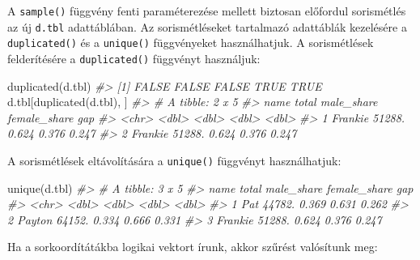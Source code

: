 \documentclass[
]{book}
\newenvironment{Shaded}{\begin{snugshade}}{\end{snugshade}}
\newcommand{\CommentTok}[1]{\textcolor[rgb]{0.56,0.35,0.01}{\textit{#1}}}
\newcommand{\FunctionTok}[1]{\textcolor[rgb]{0.00,0.00,0.00}{#1}}
\newcommand{\NormalTok}[1]{#1}
\begin{document}
A \texttt{sample()} függvény fenti paraméterezése mellett biztosan előfordul sorismétlés az új \texttt{d.tbl} adattáblában.
Az sorismétléseket tartalmazó adattáblák kezelésére a \texttt{duplicated()} és a \texttt{unique()} függvényeket használhatjuk. A sorismétlések felderítésére a \texttt{duplicated()} függvényt használjuk:

\begin{Shaded}
\begin{Highlighting}[]
\FunctionTok{duplicated}\NormalTok{(d.tbl)}
\CommentTok{\#\textgreater{} [1] FALSE FALSE FALSE  TRUE  TRUE}
\NormalTok{d.tbl[}\FunctionTok{duplicated}\NormalTok{(d.tbl), ]}
\CommentTok{\#\textgreater{} \# A tibble: 2 x 5}
\CommentTok{\#\textgreater{}   name     total male\_share female\_share   gap}
\CommentTok{\#\textgreater{}   \textless{}chr\textgreater{}    \textless{}dbl\textgreater{}      \textless{}dbl\textgreater{}        \textless{}dbl\textgreater{} \textless{}dbl\textgreater{}}
\CommentTok{\#\textgreater{} 1 Frankie 51288.      0.624        0.376 0.247}
\CommentTok{\#\textgreater{} 2 Frankie 51288.      0.624        0.376 0.247}
\end{Highlighting}
\end{Shaded}

A sorismétlések eltávolítására a \texttt{unique()} függvényt használhatjuk:

\begin{Shaded}
\begin{Highlighting}[]
\FunctionTok{unique}\NormalTok{(d.tbl)}
\CommentTok{\#\textgreater{} \# A tibble: 3 x 5}
\CommentTok{\#\textgreater{}   name     total male\_share female\_share   gap}
\CommentTok{\#\textgreater{}   \textless{}chr\textgreater{}    \textless{}dbl\textgreater{}      \textless{}dbl\textgreater{}        \textless{}dbl\textgreater{} \textless{}dbl\textgreater{}}
\CommentTok{\#\textgreater{} 1 Pat     44782.      0.369        0.631 0.262}
\CommentTok{\#\textgreater{} 2 Payton  64152.      0.334        0.666 0.331}
\CommentTok{\#\textgreater{} 3 Frankie 51288.      0.624        0.376 0.247}
\end{Highlighting}
\end{Shaded}

Ha a sorkoordítátákba logikai vektort írunk, akkor szűrést valósítunk meg:
\end{document}

